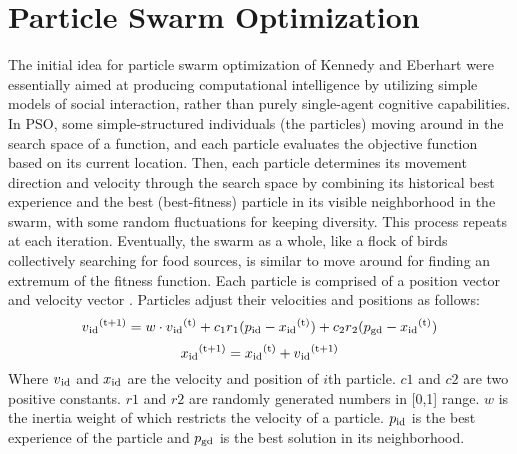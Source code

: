 \section{Particle Swarm Optimization}
The initial idea for particle swarm optimization of Kennedy and Eberhart were essentially aimed at producing computational intelligence by utilizing simple models of social interaction, rather than purely single-agent cognitive capabilities.\newline
In PSO, some simple-structured individuals (the particles) moving around in the search space of a function, and each particle evaluates the objective function based on its current location. Then, each particle determines its movement direction and velocity through the search space by combining its historical best experience and the best (best-fitness) particle in its visible neighborhood in the swarm, with some random fluctuations for keeping diversity. This process repeats at each iteration. Eventually, the swarm as a whole, like a flock of birds collectively searching for food sources, is similar to move around for finding an extremum of the fitness function.\newline
Each particle is comprised of a position vector and velocity vector \cite{bratton2007defining}. Particles adjust their velocities and positions as follows:
\begin{equation}
v\textsubscript{id}\textsuperscript{(t+1)}=w\cdot v\textsubscript{id}\textsuperscript{(t)} + c\textsubscript{1}r\textsubscript{1}(p\textsubscript{id}-x\textsubscript{id}\textsuperscript{(t)})+c\textsubscript{2}r\textsubscript{2}(p\textsubscript{gd}-x\textsubscript{id}\textsuperscript{(t)})
\end{equation}
\begin{equation}
x\textsubscript{id}\textsuperscript{(t+1)}=x\textsubscript{id}\textsuperscript{(t)}+v\textsubscript{id}\textsuperscript{(t+1)}
\end{equation}
Where $v\textsubscript{id}$ and $x\textsubscript{id}$ are the velocity and position of $i$th particle. $c1$ and $c2$ are two positive constants. $r1$ and $r2$ are randomly generated numbers in [0,1] range. $w$ is the inertia weight of which restricts the velocity of a particle. $p\textsubscript{id}$ is the best experience of the particle and $p\textsubscript{gd}$ is the best solution in its neighborhood.\newline


